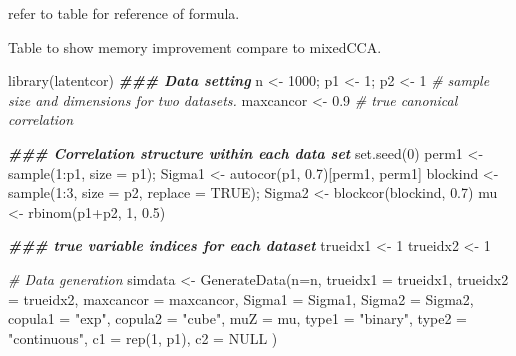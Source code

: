 \documentclass[10pt,a4paper,onecolumn]{article}
\newenvironment{Shaded}{\begin{snugshade}}{\end{snugshade}}
\newcommand{\AttributeTok}[1]{\textcolor[rgb]{0.77,0.63,0.00}{#1}}
\newcommand{\CommentTok}[1]{\textcolor[rgb]{0.56,0.35,0.01}{\textit{#1}}}
\newcommand{\ConstantTok}[1]{\textcolor[rgb]{0.00,0.00,0.00}{#1}}
\newcommand{\DecValTok}[1]{\textcolor[rgb]{0.00,0.00,0.81}{#1}}
\newcommand{\DocumentationTok}[1]{\textcolor[rgb]{0.56,0.35,0.01}{\textbf{\textit{#1}}}}
\newcommand{\FloatTok}[1]{\textcolor[rgb]{0.00,0.00,0.81}{#1}}
\newcommand{\FunctionTok}[1]{\textcolor[rgb]{0.00,0.00,0.00}{#1}}
\newcommand{\NormalTok}[1]{#1}
\newcommand{\OtherTok}[1]{\textcolor[rgb]{0.56,0.35,0.01}{#1}}
\newcommand{\SpecialCharTok}[1]{\textcolor[rgb]{0.00,0.00,0.00}{#1}}
\newcommand{\StringTok}[1]{\textcolor[rgb]{0.31,0.60,0.02}{#1}}
\begin{document}
refer to table for reference of formula.

Table to show memory improvement compare to mixedCCA.

\begin{Shaded}
\begin{Highlighting}[]
\FunctionTok{library}\NormalTok{(latentcor)}
\DocumentationTok{\#\#\# Data setting}
\NormalTok{n }\OtherTok{\textless{}{-}} \DecValTok{1000}\NormalTok{; p1 }\OtherTok{\textless{}{-}} \DecValTok{1}\NormalTok{; p2 }\OtherTok{\textless{}{-}} \DecValTok{1} \CommentTok{\# sample size and dimensions for two datasets.}
\NormalTok{maxcancor }\OtherTok{\textless{}{-}} \FloatTok{0.9} \CommentTok{\# true canonical correlation}

\DocumentationTok{\#\#\# Correlation structure within each data set}
\FunctionTok{set.seed}\NormalTok{(}\DecValTok{0}\NormalTok{)}
\NormalTok{perm1 }\OtherTok{\textless{}{-}} \FunctionTok{sample}\NormalTok{(}\DecValTok{1}\SpecialCharTok{:}\NormalTok{p1, }\AttributeTok{size =}\NormalTok{ p1);}
\NormalTok{Sigma1 }\OtherTok{\textless{}{-}} \FunctionTok{autocor}\NormalTok{(p1, }\FloatTok{0.7}\NormalTok{)[perm1, perm1]}
\NormalTok{blockind }\OtherTok{\textless{}{-}} \FunctionTok{sample}\NormalTok{(}\DecValTok{1}\SpecialCharTok{:}\DecValTok{3}\NormalTok{, }\AttributeTok{size =}\NormalTok{ p2, }\AttributeTok{replace =} \ConstantTok{TRUE}\NormalTok{);}
\NormalTok{Sigma2 }\OtherTok{\textless{}{-}} \FunctionTok{blockcor}\NormalTok{(blockind, }\FloatTok{0.7}\NormalTok{)}
\NormalTok{mu }\OtherTok{\textless{}{-}} \FunctionTok{rbinom}\NormalTok{(p1}\SpecialCharTok{+}\NormalTok{p2, }\DecValTok{1}\NormalTok{, }\FloatTok{0.5}\NormalTok{)}

\DocumentationTok{\#\#\# true variable indices for each dataset}
\NormalTok{trueidx1 }\OtherTok{\textless{}{-}} \DecValTok{1}
\NormalTok{trueidx2 }\OtherTok{\textless{}{-}} \DecValTok{1}

\CommentTok{\# Data generation}
\NormalTok{simdata }\OtherTok{\textless{}{-}} \FunctionTok{GenerateData}\NormalTok{(}\AttributeTok{n=}\NormalTok{n, }\AttributeTok{trueidx1 =}\NormalTok{ trueidx1, }\AttributeTok{trueidx2 =}\NormalTok{ trueidx2,}
                        \AttributeTok{maxcancor =}\NormalTok{ maxcancor,}
                        \AttributeTok{Sigma1 =}\NormalTok{ Sigma1, }\AttributeTok{Sigma2 =}\NormalTok{ Sigma2,}
                        \AttributeTok{copula1 =} \StringTok{"exp"}\NormalTok{, }\AttributeTok{copula2 =} \StringTok{"cube"}\NormalTok{,}
                        \AttributeTok{muZ =}\NormalTok{ mu,}
                        \AttributeTok{type1 =} \StringTok{"binary"}\NormalTok{, }\AttributeTok{type2 =} \StringTok{"continuous"}\NormalTok{,}
                        \AttributeTok{c1 =} \FunctionTok{rep}\NormalTok{(}\DecValTok{1}\NormalTok{, p1), }\AttributeTok{c2 =}  \ConstantTok{NULL}
\NormalTok{)}
\end{Highlighting}
\end{Shaded}
\end{document}
